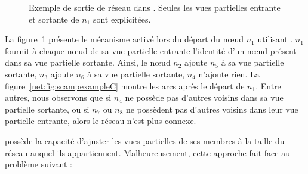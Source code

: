 \begin{figure}
  \centering
  \hspace{45pt}
  \caption[Protocole de sortie dans \SCAMP]
  {\label{net:fig:scampexample2} Exemple de sortie de réseau dans \SCAMP. Seules
    les vues partielles entrante et sortante de $n_1$ sont explicitées.}
\end{figure}

\noindent La figure~\ref{net:fig:scampexample2} présente le mécanisme activé
lors du départ du nœud $n_1$ utilisant \SCAMP. $n_1$ fournit à chaque nœud de sa
vue partielle entrante l'identité d'un nœud présent dans sa vue partielle
sortante. Ainsi, le nœud $n_2$ ajoute $n_5$ à sa vue partielle sortante, $n_3$
ajoute $n_6$ à sa vue partielle sortante, $n_4$ n'ajoute rien. La
figure~\ref{net:fig:scampexampleC} montre les arcs après le départ de
$n_1$. Entre autres, nous observons que si $n_4$ ne possède pas d'autres voisins
dans sa vue partielle sortante, ou si $n_7$ ou $n_8$ ne possèdent pas d'autres
voisins dans leur vue partielle entrante, alors le réseau n'est plus connexe.

\SCAMP possède la capacité d'ajuster les vues partielles de ses membres à la
taille du réseau auquel ils appartiennent. Malheureusement, cette approche fait
face au problème suivant :

